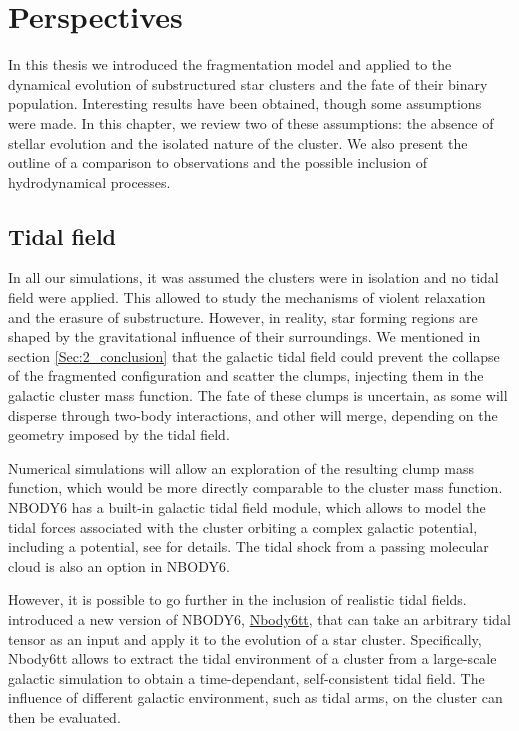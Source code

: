 \chapter{Perspectives}

In this thesis we introduced the \HubLem fragmentation model and applied to the dynamical evolution of substructured star clusters and the fate of their binary population. Interesting results have been obtained, though some assumptions were made. In this chapter, we review two of these assumptions: the absence of stellar evolution and the isolated nature of the cluster. We also present the outline of a comparison to observations and the possible inclusion of hydrodynamical processes.


\minitoc



\section{Tidal field}

In all our simulations, it was assumed the clusters were in isolation and no tidal field were applied. This allowed to study the mechanisms of violent relaxation and the erasure of substructure. However, in reality, star forming regions are shaped by the gravitational influence of their surroundings. We mentioned in section \ref{Sec:2_conclusion} that the galactic tidal field could prevent the collapse of the \HubLem fragmented configuration and scatter the clumps, injecting them in the galactic cluster mass function. The fate of these clumps is uncertain, as some will disperse through two-body interactions, and other will merge, depending on the geometry imposed by the tidal field. 

Numerical simulations will allow an exploration of the resulting clump mass function, which would be more directly comparable to the cluster mass function. NBODY6 has a built-in galactic tidal field module, which allows to model the tidal forces associated with the cluster orbiting a complex galactic potential, including a \cite{Miyamoto1975} potential, see \cite{Aarseth2003} for details. The tidal shock from a passing molecular cloud is also an option in NBODY6.

However, it is possible to go further in the inclusion of realistic tidal fields. \cite{Renaud2011} introduced a new version of NBODY6, \href{http://personal.ph.surrey.ac.uk/~fr0005/nbody6tt.php}{Nbody6tt}, that can take an arbitrary tidal tensor as an input and apply it to the evolution of a star cluster. Specifically, Nbody6tt allows to extract the tidal environment of a cluster from a large-scale galactic simulation to obtain a time-dependant, self-consistent tidal field. The influence of different galactic environment, such as tidal arms, on the cluster can then be evaluated. 

